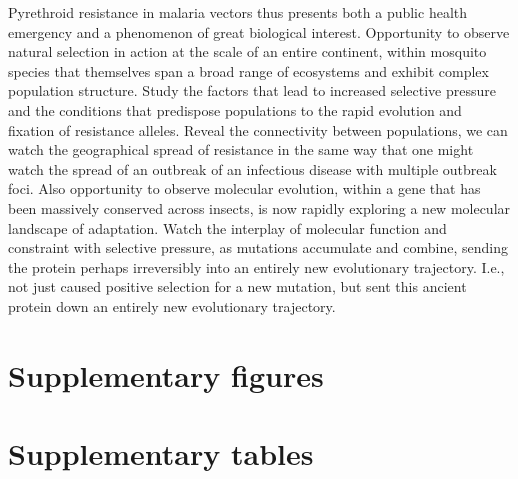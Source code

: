\documentclass[a4paper,11pt,abstracton,hidelinks]{scrartcl}
\newcommand{\beginsupplement}{%
  \setcounter{table}{0}
  \renewcommand{\thetable}{S\arabic{table}}%
  \setcounter{figure}{0}
  \renewcommand{\thefigure}{S\arabic{figure}}%
}
\begin{document}
%
Pyrethroid resistance in malaria vectors thus presents both a public health emergency and a phenomenon of great biological interest.
%
Opportunity to observe natural selection in action at the scale of an entire continent, within mosquito species that themselves span a broad range of ecosystems and exhibit complex population structure.
%
Study the factors that lead to increased selective pressure and the conditions that predispose populations to the rapid evolution and fixation of resistance alleles.
%
Reveal the connectivity between populations, we can watch the geographical spread of resistance in the same way that one might watch the spread of an outbreak of an infectious disease with multiple outbreak foci.
%
Also opportunity to observe molecular evolution, within a gene that has been massively conserved across insects, is now rapidly exploring a new molecular landscape of adaptation.
%
Watch the interplay of molecular function and constraint with selective pressure, as mutations accumulate and combine, sending the protein perhaps irreversibly into an entirely new evolutionary trajectory.
%
I.e., not just caused positive selection for a new mutation, but sent this ancient protein down an entirely new evolutionary trajectory.




\printbibliography


\beginsupplement


\section*{Supplementary figures}

\clearpage


\section*{Supplementary tables}

\clearpage
\end{document}
